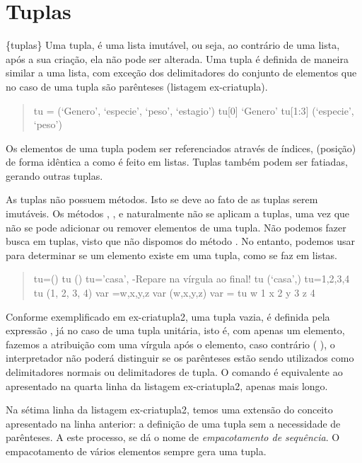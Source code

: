 \documentclass[a4paper,10pt,portuguese]{sphinxmanual}
\begin{document}
\section{Tuplas}
\label{Cap2:tuplas}
\{tuplas\} Uma tupla, é uma lista imutável, ou seja, ao contrário de
uma lista, após a sua criação, ela não pode ser alterada. Uma tupla
é definida de maneira similar a uma lista, com exceção dos
delimitadores do conjunto de elementos que no caso de uma tupla são
parênteses (listagem ex-criatupla).
\begin{quote}

tu = (`Genero', `especie', `peso', `estagio') tu{[}0{]} `Genero'
tu{[}1:3{]} (`especie', `peso')
\end{quote}

Os elementos de uma tupla podem ser referenciados através de
índices, (posição) de forma idêntica a como é feito em listas.
Tuplas também podem ser fatiadas, gerando outras tuplas.

As tuplas não possuem métodos. Isto se deve ao fato de as tuplas
serem imutáveis. Os métodos , , e 
naturalmente não se aplicam a tuplas, uma vez que não se pode
adicionar ou remover elementos de uma tupla. Não podemos fazer
busca em tuplas, visto que não dispomos do método . No
entanto, podemos usar  para determinar se um elemento existe
em uma tupla, como se faz em listas.
\begin{quote}

tu=() tu () tu='casa', -Repare na vírgula ao final! tu (`casa',)
tu=1,2,3,4 tu (1, 2, 3, 4) var =w,x,y,z var (w,x,y,z) var = tu w 1
x 2 y 3 z 4
\end{quote}

Conforme exemplificado em ex-criatupla2, uma tupla vazia, é
definida pela expressão \code{()}, já no caso de uma tupla unitária,
isto é, com apenas um elemento, fazemos a atribuição com uma
vírgula após o elemento, caso contrário ( ), o
interpretador não poderá distinguir se os parênteses estão sendo
utilizados como delimitadores normais ou delimitadores de tupla. O
comando  é equivalente ao apresentado na quarta
linha da listagem ex-criatupla2, apenas mais longo.

Na sétima linha da listagem ex-criatupla2, temos uma extensão do
conceito apresentado na linha anterior: a definição de uma tupla
sem a necessidade de parênteses. A este processo, se dá o nome de
\emph{empacotamento de sequência}. O empacotamento de vários elementos
sempre gera uma tupla.
\end{document}
